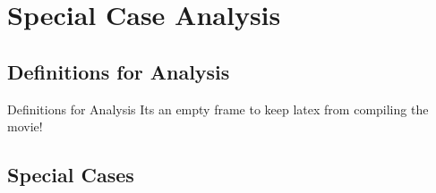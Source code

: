 \section{Special Case Analysis}

\subsection{Definitions for Analysis}

\begin{frame}{Definitions for Analysis}
  Its an empty frame to keep latex from compiling the movie!





\end{frame}

\subsection{Special Cases}

